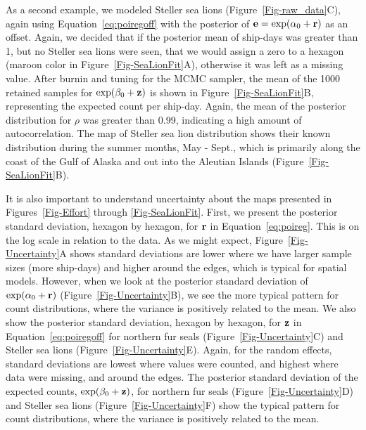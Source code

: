 \documentclass[11pt, titlepage]{article}
\begin{document}
\begin{spacing}{1.9}
\begin{flushleft}
As a second example, we modeled Steller sea lions (Figure~\ref{Fig-raw_data}C), again using Equation~\eqref{eq:poiregoff} with the posterior of $\mathbf{e} = \exp(\alpha_{0} + \mathbf{r})$ as an offset. Again, we decided that if the posterior mean of ship-days was greater than 1, but no Steller sea lions were seen, that we would assign a zero to a hexagon (maroon color in Figure~\ref{Fig-SeaLionFit}A), otherwise it was left as a missing value. After burnin and tuning for the MCMC sampler, the mean of the 1000 retained samples for $\exp(\beta_{0} + \mathbf{z})$ is shown in Figure~\ref{Fig-SeaLionFit}B, representing the expected count per ship-day. Again, the mean of the posterior distribution for $\rho$ was greater than 0.99, indicating a high amount of autocorrelation. The map of Steller sea lion distribution shows their known distribution  during the summer months, May - Sept., which is primarily along the coast of the Gulf of Alaska and out into the Aleutian Islands (Figure~\ref{Fig-SeaLionFit}B).

It is also important to understand uncertainty about the maps presented in Figures~\ref{Fig-Effort} through \ref{Fig-SeaLionFit}.  First, we present the posterior standard deviation, hexagon by hexagon, for $\mathbf{r}$ in Equation~\eqref{eq:poireg}.  This is on the log scale in relation to the data.  As we might expect, Figure~\ref{Fig-Uncertainty}A shows standard deviations are lower where we have larger sample sizes (more ship-days) and higher around the edges, which is typical for spatial models.  However, when we look at the posterior standard deviation of $\exp(\alpha_{0} + \mathbf{r})$ (Figure~\ref{Fig-Uncertainty}B), we see the more typical pattern for count distributions, where the variance is positively related to the mean.  We also show the posterior standard deviation, hexagon by hexagon, for $\mathbf{z}$ in Equation~\eqref{eq:poiregoff} for northern fur seals (Figure~\ref{Fig-Uncertainty}C) and Steller sea lions (Figure~\ref{Fig-Uncertainty}E).  Again, for the random effects, standard deviations are lowest where values were counted, and highest where data were missing, and around the edges. The posterior standard deviation of the expected counts, $\exp(\beta_{0} + \mathbf{z})$, for northern fur seals (Figure~\ref{Fig-Uncertainty}D) and Steller sea lions (Figure~\ref{Fig-Uncertainty}F) show the typical pattern for count distributions, where the variance is positively related to the mean.    
 


\end{flushleft}
\end{spacing}
\end{document}
